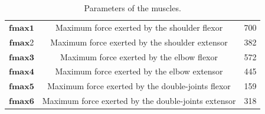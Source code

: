\documentclass[pdftex,a4paper,11pt]{article}
\begin{document}
\begin{table}[hbt]
\caption{Parameters of the muscles.}
\begin{center}
\begin{tabular}{|c|c|c|}
\hline  
$\textbf{fmax1}$ & Maximum force exerted by the shoulder flexor & 700\\
$\textbf{fmax}$2 & Maximum force exerted by the shoulder extensor & 382\\
$\textbf{fmax3}$ & Maximum force exerted by the elbow flexor & 572\\
$\textbf{fmax4}$ & Maximum force exerted by the elbow extensor & 445\\
$\textbf{fmax5}$ & Maximum force exerted by the double-joints flexor & 159\\
$\textbf{fmax6}$ & Maximum force exerted by the double-joints extensor & 318\\
\hline
\end{tabular}
\end{center}
\label{arm_model_params}
\end{table}



\end{document}
